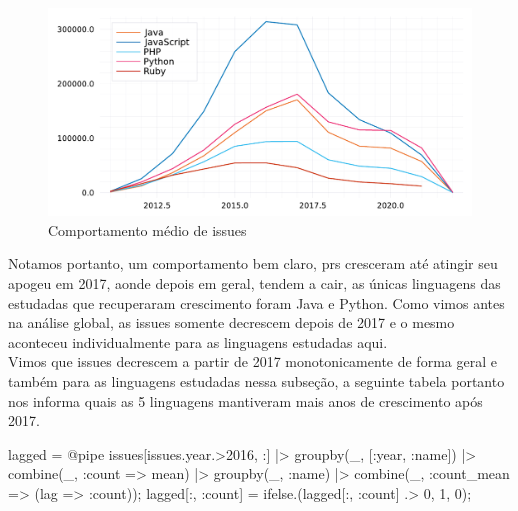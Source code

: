\documentclass[
  letterpaper,
  DIV=11,
  numbers=noendperiod]{scrartcl}
\newenvironment{Shaded}{\begin{snugshade}}{\end{snugshade}}
\newcommand{\FloatTok}[1]{\textcolor[rgb]{0.68,0.00,0.00}{#1}}
\newcommand{\FunctionTok}[1]{\textcolor[rgb]{0.28,0.35,0.67}{#1}}
\newcommand{\NormalTok}[1]{\textcolor[rgb]{0.00,0.23,0.31}{#1}}
\newcommand{\OperatorTok}[1]{\textcolor[rgb]{0.37,0.37,0.37}{#1}}
\newcommand{\PreprocessorTok}[1]{\textcolor[rgb]{0.68,0.00,0.00}{#1}}
\begin{document}
\begin{figure}[H]

{\centering \includegraphics{report_files/figure-pdf/fig-plot3-output-1.pdf}

}

\caption{\label{fig-plot3}Comportamento médio de issues}

\end{figure}

Notamos portanto, um comportamento bem claro, prs cresceram até atingir
seu apogeu em 2017, aonde depois em geral, tendem a cair, as únicas
linguagens das estudadas que recuperaram crescimento foram Java e
Python. Como vimos antes na análise global, as issues somente decrescem
depois de 2017 e o mesmo aconteceu individualmente para as linguagens
estudadas aqui.\\
Vimos que issues decrescem a partir de 2017 monotonicamente de forma
geral e também para as linguagens estudadas nessa subseção, a seguinte
tabela portanto nos informa quais as 5 linguagens mantiveram mais anos
de crescimento após 2017.

\begin{Shaded}
\begin{Highlighting}[]
\NormalTok{lagged }\OperatorTok{=} \PreprocessorTok{@pipe}\NormalTok{ issues[issues.year}\OperatorTok{.\textgreater{}}\FloatTok{2016}\NormalTok{, }\OperatorTok{:}\NormalTok{] }\OperatorTok{|\textgreater{}}
               \FunctionTok{groupby}\NormalTok{(\_, [}\OperatorTok{:}\NormalTok{year, }\OperatorTok{:}\NormalTok{name]) }\OperatorTok{|\textgreater{}}
               \FunctionTok{combine}\NormalTok{(\_, }\OperatorTok{:}\NormalTok{count }\OperatorTok{=\textgreater{}}\NormalTok{ mean) }\OperatorTok{|\textgreater{}}
               \FunctionTok{groupby}\NormalTok{(\_, }\OperatorTok{:}\NormalTok{name) }\OperatorTok{|\textgreater{}}
               \FunctionTok{combine}\NormalTok{(\_, }\OperatorTok{:}\NormalTok{count\_mean }\OperatorTok{=\textgreater{}}\NormalTok{ (lag }\OperatorTok{=\textgreater{}} \OperatorTok{:}\NormalTok{count));}
\NormalTok{lagged[}\OperatorTok{:}\NormalTok{, }\OperatorTok{:}\NormalTok{count] }\OperatorTok{=}  \FunctionTok{ifelse}\NormalTok{.(lagged[}\OperatorTok{:}\NormalTok{, }\OperatorTok{:}\NormalTok{count] }\OperatorTok{.\textgreater{}} \FloatTok{0}\NormalTok{, }\FloatTok{1}\NormalTok{, }\FloatTok{0}\NormalTok{);}
\end{Highlighting}
\end{Shaded}
\end{document}
